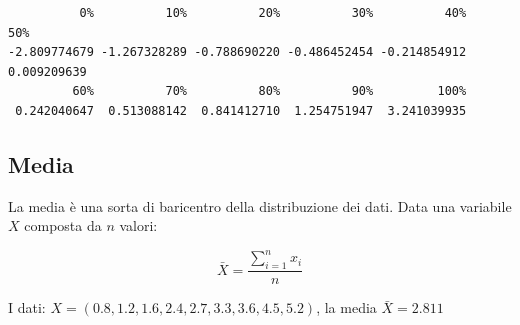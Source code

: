 \documentclass[
  a4paper,
  DIV=11,
  numbers=noendperiod]{scrreprt}
\begin{document}
\begin{verbatim}
          0%          10%          20%          30%          40%          50% 
-2.809774679 -1.267328289 -0.788690220 -0.486452454 -0.214854912  0.009209639 
         60%          70%          80%          90%         100% 
 0.242040647  0.513088142  0.841412710  1.254751947  3.241039935 
\end{verbatim}

\subsection{Media}\label{media}

La media è una sorta di baricentro della distribuzione dei dati. Data
una variabile \(X\) composta da \(n\) valori:

\begin{equation*}
\bar{X} = \dfrac{\sum_{i = 1}^{n}x_i}{n}
\end{equation*}

\begin{center}
\end{center}

I dati: \(X = (0.8,1.2,1.6,2.4,2.7,3.3,3.6,4.5,5.2)\), la media
\(\bar{X} = 2.811\)
\end{document}
